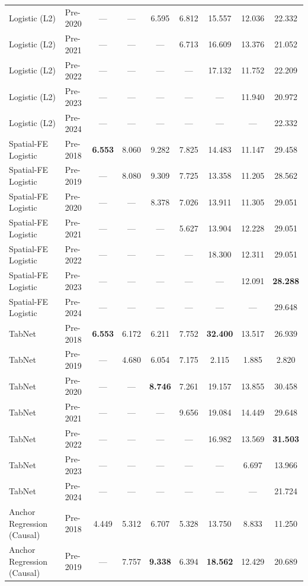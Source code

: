 \begin{table}[htbp]
{\begin{tabular}{l lccccccc}
Logistic (L2) & Pre-2020 & --- & --- & 6.595 & 6.812 & 15.557 & 12.036 & 22.332 \\
Logistic (L2) & Pre-2021 & --- & --- & --- & 6.713 & 16.609 & 13.376 & 21.052 \\
Logistic (L2) & Pre-2022 & --- & --- & --- & --- & 17.132 & 11.752 & 22.209 \\
Logistic (L2) & Pre-2023 & --- & --- & --- & --- & --- & 11.940 & 20.972 \\
Logistic (L2) & Pre-2024 & --- & --- & --- & --- & --- & --- & 22.332 \\
Spatial-FE Logistic & Pre-2018 & \textbf{6.553} & 8.060 & 9.282 & 7.825 & 14.483 & 11.147 & 29.458 \\
Spatial-FE Logistic & Pre-2019 & --- & 8.080 & 9.309 & 7.725 & 13.358 & 11.205 & 28.562 \\
Spatial-FE Logistic & Pre-2020 & --- & --- & 8.378 & 7.026 & 13.911 & 11.305 & 29.051 \\
Spatial-FE Logistic & Pre-2021 & --- & --- & --- & 5.627 & 13.904 & 12.228 & 29.051 \\
Spatial-FE Logistic & Pre-2022 & --- & --- & --- & --- & 18.300 & 12.311 & 29.051 \\
Spatial-FE Logistic & Pre-2023 & --- & --- & --- & --- & --- & 12.091 & \textbf{28.288} \\
Spatial-FE Logistic & Pre-2024 & --- & --- & --- & --- & --- & --- & 29.648 \\
TabNet & Pre-2018 & \textbf{6.553} & 6.172 & 6.211 & 7.752 & \textbf{32.400} & 13.517 & 26.939 \\
TabNet & Pre-2019 & --- & 4.680 & 6.054 & 7.175 & 2.115 & 1.885 & 2.820 \\
TabNet & Pre-2020 & --- & --- & \textbf{8.746} & 7.261 & 19.157 & 13.855 & 30.458 \\
TabNet & Pre-2021 & --- & --- & --- & 9.656 & 19.084 & 14.449 & 29.648 \\
TabNet & Pre-2022 & --- & --- & --- & --- & 16.982 & 13.569 & \textbf{31.503} \\
TabNet & Pre-2023 & --- & --- & --- & --- & --- & 6.697 & 13.966 \\
TabNet & Pre-2024 & --- & --- & --- & --- & --- & --- & 21.724 \\
Anchor Regression (Causal) & Pre-2018 & 4.449 & 5.312 & 6.707 & 5.328 & 13.750 & 8.833 & 11.250 \\
Anchor Regression (Causal) & Pre-2019 & --- & 7.757 & \textbf{9.338} & 6.394 & \textbf{18.562} & 12.429 & 20.689 \\

\end{tabular}}
\end{table}

